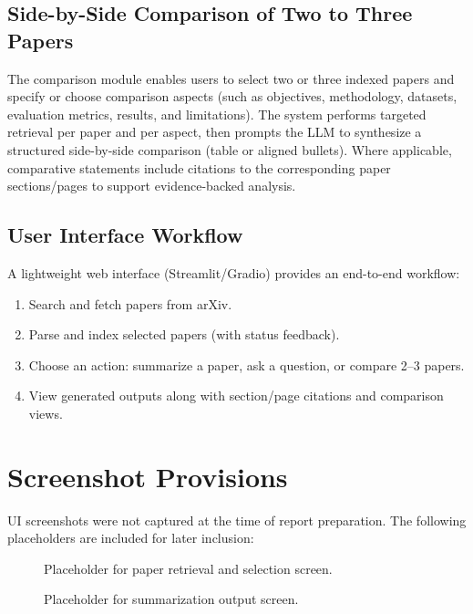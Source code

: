 \subsection{Side-by-Side Comparison of Two to Three Papers}
The comparison module enables users to select two or three indexed papers and specify or choose comparison aspects (such as objectives, methodology, datasets, evaluation metrics, results, and limitations). The system performs targeted retrieval per paper and per aspect, then prompts the LLM to synthesize a structured side-by-side comparison (table or aligned bullets). Where applicable, comparative statements include citations to the corresponding paper sections/pages to support evidence-backed analysis.

\subsection{User Interface Workflow}
A lightweight web interface (Streamlit/Gradio) provides an end-to-end workflow:
\begin{enumerate}
    \item Search and fetch papers from arXiv.
    \item Parse and index selected papers (with status feedback).
    \item Choose an action: summarize a paper, ask a question, or compare 2--3 papers.
    \item View generated outputs along with section/page citations and comparison views.
\end{enumerate}

\section{Screenshot Provisions}
UI screenshots were not captured at the time of report preparation. The following placeholders are included for later inclusion:

\begin{figure}[H]
    \centering
    \caption{Placeholder for paper retrieval and selection screen.}
    \label{fig:ui_paper_selection}
\end{figure}

\begin{figure}[H]
    \centering
    \caption{Placeholder for summarization output screen.}
    \label{fig:ui_summary}
\end{figure}

